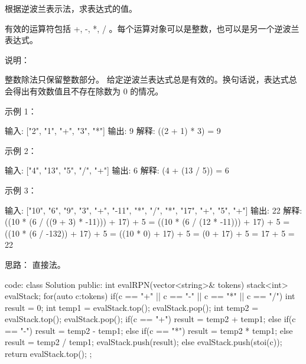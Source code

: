 根据逆波兰表示法，求表达式的值。

有效的运算符包括 +, -, *, / 。每个运算对象可以是整数，也可以是另一个逆波兰表达式。

说明：

    整数除法只保留整数部分。
    给定逆波兰表达式总是有效的。换句话说，表达式总会得出有效数值且不存在除数为 0 的情况。

示例 1：

输入: ["2", "1", "+", "3", "*"]
输出: 9
解释: ((2 + 1) * 3) = 9

示例 2：

输入: ["4", "13", "5", "/", "+"]
输出: 6
解释: (4 + (13 / 5)) = 6

示例 3：

输入: ["10", "6", "9", "3", "+", "-11", "*", "/", "*", "17", "+", "5", "+"]
输出: 22
解释: 
  ((10 * (6 / ((9 + 3) * -11))) + 17) + 5
= ((10 * (6 / (12 * -11))) + 17) + 5
= ((10 * (6 / -132)) + 17) + 5
= ((10 * 0) + 17) + 5
= (0 + 17) + 5
= 17 + 5
= 22
































思路：
直接法。




























code:
class Solution {
public:
    int evalRPN(vector<string>& tokens) {
        stack<int> evalStack;
        for(auto c:tokens)
        {
            if(c == "+" || c == "-" || c == "*" || c == "/")
            {
                int result = 0;
                int temp1 = evalStack.top();
                evalStack.pop();
                int temp2 = evalStack.top();
                evalStack.pop();
                if(c == "+") result = temp2 + temp1;
                else if(c == "-") result = temp2 - temp1;
                else if(c == "*") result = temp2 * temp1;
                else result = temp2 / temp1;
                evalStack.push(result);
            }
            else evalStack.push(stoi(c));
        }
        return evalStack.top();
    }
};